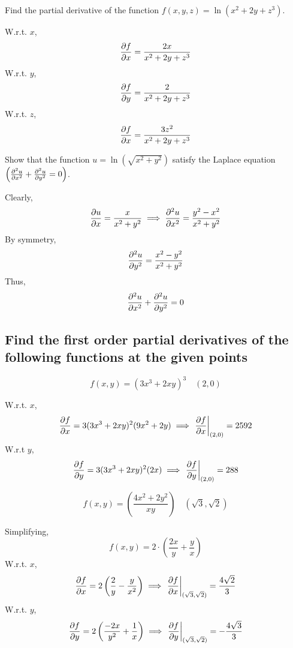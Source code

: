 \begin{asign}
	Find the partial derivative of the function $f(x,y,z)=\ln(x^2+2y+z^3)$.
\end{asign}
\begin{anse}
	W.r.t. $x$,
	\[\pdv{f}{x}=\frac{2x}{x^2+2y+z^3}\]
	W.r.t. $y$,
	\[\pdv{f}{y}=\frac{2}{x^2+2y+z^3}\]
	W.r.t. $z$,
	\[\pdv{f}{x}=\frac{3z^2}{x^2+2y+z^3}\]
\end{anse}
\begin{asign}
	Show that the function $u=\ln(\sqrt{x^2+y^2})$ satisfy the Laplace equation $\left(\pdv[2]{u}{x}+\pdv[2]{u}{y}=0\right)$.
\end{asign}
\begin{anse}
	Clearly,
	\[\pdv{u}{x}=\frac{x}{x^2+y^2}\implies \pdv[2]{u}{x}=\frac{y^2-x^2}{x^2+y^2}\]
	By symmetry,
	\[\pdv[2]{u}{y}=\frac{x^2-y^2}{x^2+y^2}\]
	Thus,
	\[\pdv[2]{u}{x}+\pdv[2]{u}{y}=0\]
\end{anse}
\subsection{Find the first order partial derivatives of the following functions at the given points}
\begin{asign}
	\[f(x,y)=(3x^3+2xy)^3\quad (2,0)\]
\end{asign}
\begin{anse}
	W.r.t. $x$,
	\[\pdv{f}{x}=3(3x^3+2xy)^2(9x^2+2y)\implies \eval{\pdv{f}{x}}_{(2,0)}=2592\]
	W.r.t $y$,
	\[\pdv{f}{y}=3(3x^3+2xy)^2(2x)\implies\eval{\pdv{f}{y}}_{(2,0)}=288\]
\end{anse}
\begin{asign}
	\[f(x,y)=\left(\frac{4x^2+2y^2}{xy}\right)\quad (\sqrt{3},\sqrt{2})\]
\end{asign}
\begin{anse}
	Simplifying,
	\[f(x,y)=2\cdot\left(\frac{2x}{y}+\frac{y}{x}\right)\]
	W.r.t. $x$,
	\[\pdv{f}{x}=2\left(\frac{2}{y}-\frac{y}{x^2}\right)\implies\eval{\pdv{f}{x}}_{(\sqrt{3},\sqrt{2})}=\frac{4\sqrt{2}}{3}\]
	W.r.t. $y$,
	\[\pdv{f}{y}=2\left(\frac{-2x}{y^2}+\frac{1}{x}\right)\implies \eval{\pdv{f}{y}}_{(\sqrt{3},\sqrt{2})}=-\frac{4\sqrt{3}}{3}\]
\end{anse}
